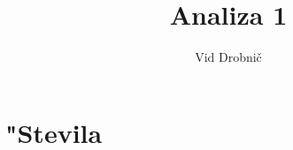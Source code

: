 \documentclass[a4paper, 12pt]{article}
\title{Analiza 1}
\author{Vid Drobnič}
\date{}
\begin{document}
	\maketitle
	\thispagestyle{empty}
	\pagebreak
	\setcounter{page}{1}

	\tableofcontents
	\pagebreak

	\section{"Stevila}
	
\end{document}

